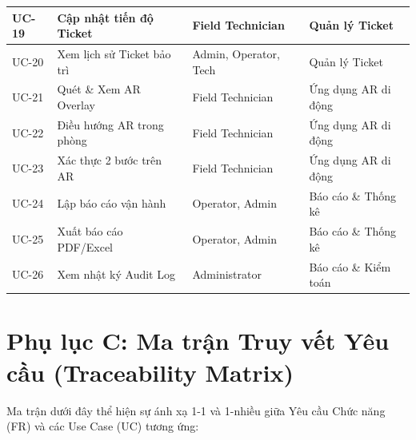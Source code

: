 \begin{longtable}{|p{1.5cm}|p{4.5cm}|p{3.5cm}|p{5cm}|}
UC-19 & Cập nhật tiến độ Ticket & Field Technician & Quản lý Ticket \\ \hline
UC-20 & Xem lịch sử Ticket bảo trì & Admin, Operator, Tech & Quản lý Ticket \\ \hline
UC-21 & Quét \& Xem AR Overlay & Field Technician & Ứng dụng AR di động \\ \hline
UC-22 & Điều hướng AR trong phòng & Field Technician & Ứng dụng AR di động \\ \hline
UC-23 & Xác thực 2 bước trên AR & Field Technician & Ứng dụng AR di động \\ \hline
UC-24 & Lập báo cáo vận hành & Operator, Admin & Báo cáo \& Thống kê \\ \hline
UC-25 & Xuất báo cáo PDF/Excel & Operator, Admin & Báo cáo \& Thống kê \\ \hline
UC-26 & Xem nhật ký Audit Log & Administrator & Báo cáo \& Kiểm toán \\ \hline
\end{longtable}

\section{Phụ lục C: Ma trận Truy vết Yêu cầu (Traceability Matrix)}
Ma trận dưới đây thể hiện sự ánh xạ 1-1 và 1-nhiều giữa Yêu cầu Chức năng (FR) và các Use Case (UC) tương ứng:

